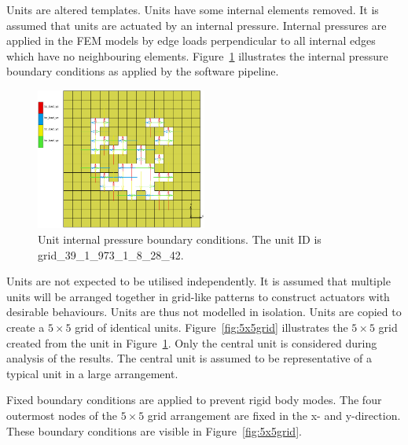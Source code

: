 Units are altered templates. Units have some internal elements removed. It is assumed that units are actuated by an internal pressure. Internal pressures are applied in the FEM models by edge loads perpendicular to all internal edges which have no neighbouring elements. Figure~\ref{fig:uip} illustrates the internal pressure boundary conditions as applied by the software pipeline.

\begin{figure}[ht]
	\centering
	\includegraphics[width=0.5\textwidth]{5x5Single.png}
	\caption[Unit internal pressure boundary conditions]{Unit internal pressure boundary conditions. The unit ID is grid\_39\_1\_973\_1\_8\_28\_42.}
	\label{fig:uip}
\end{figure}

Units are not expected to be utilised independently. It is assumed that multiple units will be arranged together in grid-like patterns to construct actuators with desirable behaviours. Units are thus not modelled in isolation. Units are copied to create a $5\times 5$ grid of identical units. Figure~\ref{fig:5x5grid} illustrates the $5\times 5$ grid created from the unit in Figure~\ref{fig:uip}. Only the central unit is considered during analysis of the results. The central unit is assumed to be representative of a typical unit in a large arrangement.

Fixed boundary conditions are applied to prevent rigid body modes. The four outermost nodes of the $5\times 5$ grid arrangement are fixed in the x- and y-direction. These boundary conditions are visible in Figure~\ref{fig:5x5grid}.

